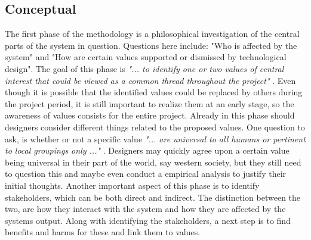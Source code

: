 \subsection{Conceptual}
The first phase of the methodology is a philosophical investigation of the central parts of the system in question. Questions here include: "Who is affected by the system" and "How are certain values supported or dismissed by technological design".\newline 
The goal of this phase is \textit{"... to identify one or two values of central interest that could be viewed as a common thread throughout the project"} \citep[p. 703]{IntegratingEthicsCummings}. Even though it is possible that the identified values could be replaced by others during the project period, it is still important to realize them at an early stage, so the awareness of values consists for the entire project. Already in this phase should designers consider different things related to the proposed values. One question to ask, is whether or not a specific value \textit{"... are universal to all humans or pertinent to local groupings only ..."} \citep[p. 326]{EmbodyingValues}. Designers may quickly agree upon a certain value being universal in their part of the world, say western society, but they still need to question this and maybe even conduct a empirical analysis to justify their initial thoughts. \newline
Another important aspect of this phase is to identify stakeholders, which can be both direct and indirect. The distinction between the two, are how they interact with the system and how they are affected by the systems output. Along with identifying the stakeholders, a next step is to find benefits and harms for these and link them to values. 

